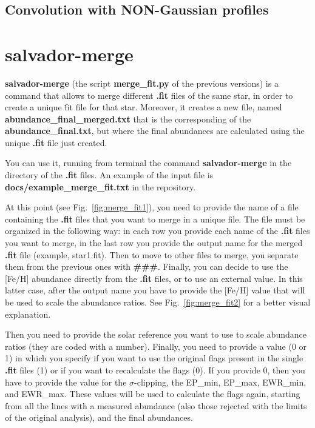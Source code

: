 \documentclass[modern]{aastex701}
\begin{document}
\subsection{Convolution with NON-Gaussian profiles}


{}


\appendix
\section{{\bf salvador-merge}} \label{appendix_b}
{\bf salvador-merge} (the script {\bf merge\_fit.py} of the previous versions) is a command that allows to merge different {\bf .fit} files of the same star, in order to create a unique {\.fit} file for that star. Moreover, it creates a new file, named {\bf abundance\_final\_merged.txt} that is the corresponding of the {\bf abundance\_final.txt}, but where the final abundances are calculated using the unique {\bf .fit} file just created. 

You can use it, running from terminal the command {\bf salvador-merge} in the directory of the {\bf .fit} files. An example of the input file is {\bf docs/example\_merge\_fit.txt} in the repository. 

At this point (see Fig.~\ref{fig:merge_fit1}), you need to provide the name of a file containing the {\bf .fit} files that you want to merge in a unique file. 
The file must be organized in the following way: in each row you provide each name of the {\bf .fit} files you want to merge, in the last row you provide the output name for the merged {\bf .fit} file (example, star1.fit). Then to move to other files to merge, you separate them from the previous ones with {\bf \#\#\#}.
Finally, you can decide to use the [Fe/H] abundance directly from the {\bf .fit} files, or to use an external value. In this latter case, after the output name you have to provide the [Fe/H] value that will be used to scale the abundance ratios. 
See Fig.~\ref{fig:merge_fit2} for a better visual explanation. 

Then you need to provide the solar reference you want to use to scale abundance ratios (they are coded with a number). 
Finally, you need to provide a value (0 or 1) in which you specify if you want to use the original flags present in the single {\bf .fit} files (1) or if you want to recalculate the flags (0). 
If you provide 0, then you have to provide the value for the $\sigma$-clipping, the EP\_min, EP\_max, EWR\_min, and EWR\_max. These values will be used to calculate the flags again, starting from all the lines with a measured abundance (also those rejected with the limits of the original analysis), and the final abundances. 
\end{document}
